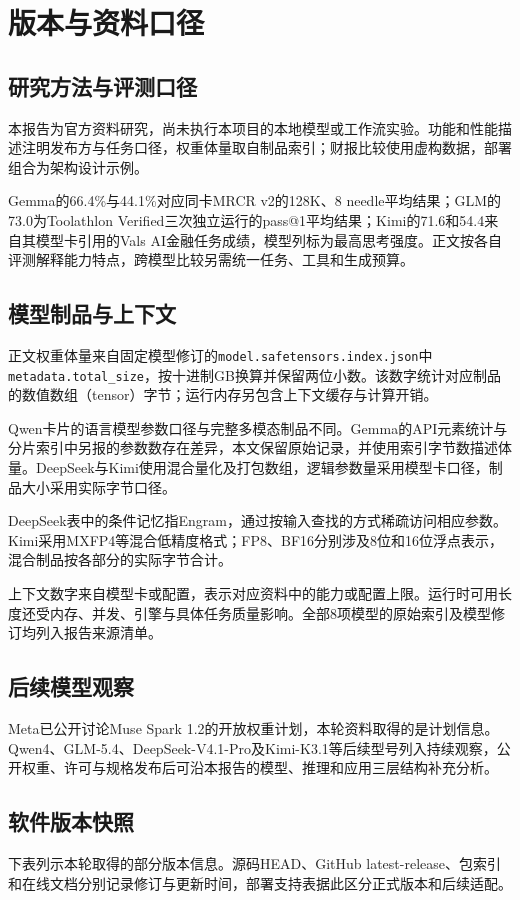 \section{版本与资料口径}

\subsection{研究方法与评测口径}
本报告为官方资料研究，尚未执行本项目的本地模型或工作流实验。功能和性能描述注明发布方与任务口径，权重体量取自制品索引；财报比较使用虚构数据，部署组合为架构设计示例。

Gemma的66.4\%与44.1\%对应同卡MRCR v2的128K、8 needle平均结果；GLM的73.0为Toolathlon Verified三次独立运行的pass@1平均结果；Kimi的71.6和54.4来自其模型卡引用的Vals AI金融任务成绩，模型列标为最高思考强度。正文按各自评测解释能力特点，跨模型比较另需统一任务、工具和生成预算。

\subsection{模型制品与上下文}
正文权重体量来自固定模型修订的\texttt{model.safetensors.index.json}中\texttt{metadata.total\_size}，按十进制GB换算并保留两位小数。该数字统计对应制品的数值数组（tensor）字节；运行内存另包含上下文缓存与计算开销。

Qwen卡片的语言模型参数口径与完整多模态制品不同。Gemma的API元素统计与分片索引中另报的参数数存在差异，本文保留原始记录，并使用索引字节数描述体量。DeepSeek与Kimi使用混合量化及打包数组，逻辑参数量采用模型卡口径，制品大小采用实际字节口径。

DeepSeek表中的条件记忆指Engram，通过按输入查找的方式稀疏访问相应参数。Kimi采用MXFP4等混合低精度格式；FP8、BF16分别涉及8位和16位浮点表示，混合制品按各部分的实际字节合计。

上下文数字来自模型卡或配置，表示对应资料中的能力或配置上限。运行时可用长度还受内存、并发、引擎与具体任务质量影响。全部8项模型的原始索引及模型修订均列入报告来源清单。

\subsection{后续模型观察}
Meta已公开讨论Muse Spark 1.2的开放权重计划，本轮资料取得的是计划信息。Qwen4、GLM-5.4、DeepSeek-V4.1-Pro及Kimi-K3.1等后续型号列入持续观察，公开权重、许可与规格发布后可沿本报告的模型、推理和应用三层结构补充分析。

\subsection{软件版本快照}
下表列示本轮取得的部分版本信息。源码HEAD、GitHub latest-release、包索引和在线文档分别记录修订与更新时间，部署支持表据此区分正式版本和后续适配。

